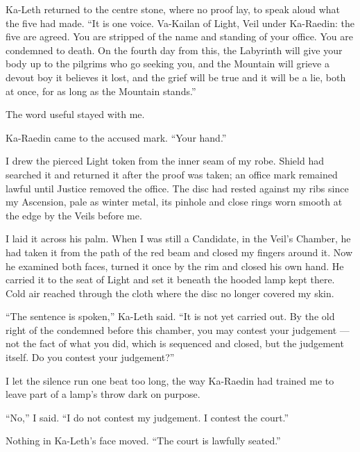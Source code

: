 Ka-Leth returned to the centre stone, where no proof lay, to speak aloud what the five had made. ``It is one voice. Va-Kailan of Light, Veil under Ka-Raedin: the five are agreed. You are stripped of the name and standing of your office. You are condemned to death. On the fourth day from this, the Labyrinth will give your body up to the pilgrims who go seeking you, and the Mountain will grieve a devout boy it believes it lost, and the grief will be true and it will be a lie, both at once, for as long as the Mountain stands.''\par

The word useful stayed with me.\par

Ka-Raedin came to the accused mark. ``Your hand.''\par

I drew the pierced Light token from the inner seam of my robe. Shield had searched it and returned it after the proof was taken; an office mark remained lawful until Justice removed the office. The disc had rested against my ribs since my Ascension, pale as winter metal, its pinhole and close rings worn smooth at the edge by the Veils before me.\par

I laid it across his palm. When I was still a Candidate, in the Veil's Chamber, he had taken it from the path of the red beam and closed my fingers around it. Now he examined both faces, turned it once by the rim and closed his own hand. He carried it to the seat of Light and set it beneath the hooded lamp kept there. Cold air reached through the cloth where the disc no longer covered my skin.\par

``The sentence is spoken,'' Ka-Leth said. ``It is not yet carried out. By the old right of the condemned before this chamber, you may contest your judgement --- not the fact of what you did, which is sequenced and closed, but the judgement itself. Do you contest your judgement?''\par

I let the silence run one beat too long, the way Ka-Raedin had trained me to leave part of a lamp's throw dark on purpose.\par

``No,'' I said. ``I do not contest my judgement. I contest the court.''\par

Nothing in Ka-Leth's face moved. ``The court is lawfully seated.''\par

